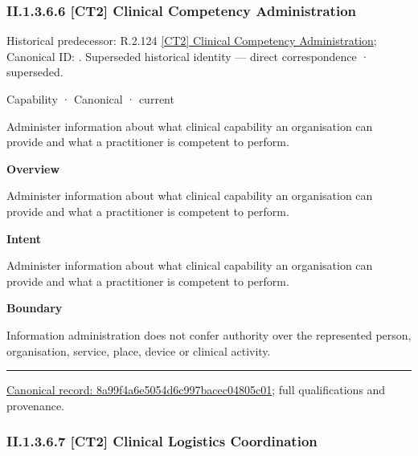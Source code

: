 \subsubsection*{II.1.3.6.6 [CT2] Clinical Competency Administration}
\label{navigation:II.1.3.6.6}

{\small Historical predecessor: R.2.124 \hyperref[element:8a4b918e1c9d47bb99daf2b42008ab39]{[CT2] Clinical Competency Administration}; Canonical ID: \texttt{}. Superseded historical identity — direct correspondence · superseded.}\par
\label{element:8a99f4a6e5054d6c997bacec04805c01}
{\small Capability · Canonical · current}\par

Administer information about what clinical capability an organisation can provide and what a practitioner is competent to perform.



\textbf{Overview}



Administer information about what clinical capability an organisation can provide and what a practitioner is competent to perform.



\textbf{Intent}



Administer information about what clinical capability an organisation can provide and what a practitioner is competent to perform.



\textbf{Boundary}



Information administration does not confer authority over the represented person, organisation, service, place, device or clinical activity.



\medskip\hrule\medskip

{\footnotesize \href{../../../../continuum/strategy/capability/8a99f4a6e5054d6c997bacec04805c01.md}{Canonical record: 8a99f4a6e5054d6c997bacec04805c01}; full qualifications and provenance.}\par
\subsubsection*{II.1.3.6.7 [CT2] Clinical Logistics Coordination}
\label{navigation:II.1.3.6.7}

